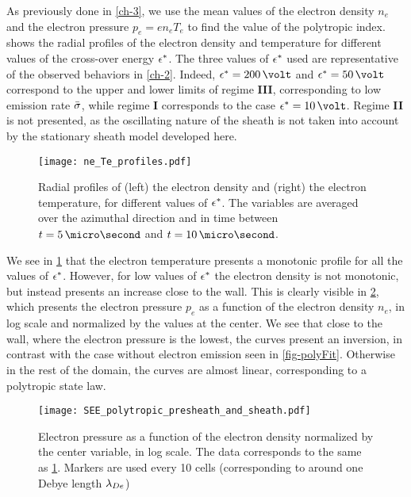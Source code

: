 As previously done in \cref{ch-3}, we use the mean values of the electron density $n_e$ and the electron pressure $ p_e = e n_e T_e$ to find the value of the polytropic index.
 shows the radial profiles of the electron density and temperature for different values of the cross-over energy $\epsilon^{*}$.
The three values of $\epsilon^{*}$ used are representative of the observed behaviors in \cref{ch-2}.
Indeed, $\crover=200\,\volt$ and $\crover=50\,\volt$ correspond to the upper and lower limits of regime {\bf III}, corresponding to low emission rate $ \bar{\sigma }$, while regime {\bf I} corresponds to the case $\crover=10\,\volt$.
Regime {\bf II} is not presented, as the oscillating nature of the sheath is not taken into account by the stationary sheath model developed here. 


\begin{figure}[!htb]
  \centering
  \texttt{[image: ne\_Te\_profiles.pdf]}
  \caption{Radial profiles of (left) the electron density and (right) the electron temperature, for different values of $\epsilon^{*}$. The variables are averaged over the azimuthal direction and in time between $t=5\,\micro\second$ and $t=10\,\micro\second$.  }
  \label{fig-radial_profiles_see}
\end{figure}

We see in \cref{fig-radial_profiles_see} that the electron temperature presents a monotonic profile for all the values of $\epsilon^{*}$.
However, for low values of $\epsilon^{*}$ the electron density is not monotonic, but instead presents an increase close to the wall.
This is clearly visible in \cref{fig-log_pe-ne}, which presents the electron pressure $p_e$ as a function of the electron density $n_e$, in log scale and normalized by the values at the center.
We see that close to the wall, where the electron pressure is the lowest, the curves present an inversion, in contrast with the case without electron emission seen in \cref{fig-polyFit}.
Otherwise in the rest of the domain, the curves are almost linear, corresponding to a polytropic state law.

\begin{figure}[!htb]
  \centering
  \texttt{[image: SEE\_polytropic\_presheath\_and\_sheath.pdf]}
  \caption{Electron pressure as a function of the electron density normalized by the center variable, in log scale. The data corresponds to the same as \cref{fig-radial_profiles_see}. Markers are used every 10 cells (corresponding to around one Debye length $\lambda_{De}$)}
  \label{fig-log_pe-ne}
\end{figure}

